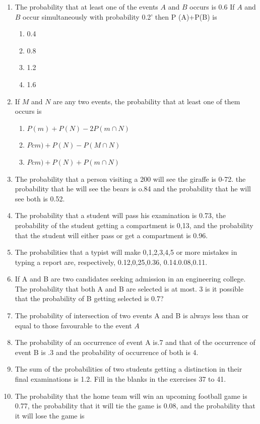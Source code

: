 \documentclass[12pt]{article}
\begin{document}
\begin{enumerate}
\item The probability that at least one of the events $A$ and $B$ occurs is 0.6 If $A$ and $B$ occur simultaneously with probability 0.2' then P  (A)+P(B) is
	\begin{enumerate}
\item 0.4
\item 0.8
\item 1.2
\item 1.6
	\end{enumerate}
\item If $M$ and $N$ are any two events, the probability that at least one of them occurs is
	\begin{enumerate}
\item $P(m)+P(N)-2 P (m\cap N)$
\item $Pcm)+P(N)-P(M\cap N)$
\item $Pcm)+P(N)+P(m\cap N)$
	\end{enumerate}
\item The probability that a person visiting a 200 will see the giraffe is 0-72. the probability that he will see the bears is o.84 and the probability that he will see both is 0.52.
\item The probability that a student will pass his examination is 0.73, the probability of the student getting a compartment is 0,13, and the probability that the student will either pass or get a compartment is 0.96.
\item The probabilities that a typist will make 0,1,2,3,4,5 or more mistakes in typing a report are, respectively, 0.12,0,25,0.36, 0.14.0.08,0.11.
\item If A and B are two candidates seeking admission in an engineering college. The probability that both A and B are selected is at most. 3 is it possible that the probability of B getting selected is 0.7?
\item The probability of intersection of two events A and B is always less than or equal to those favourable to the event $A$
\item The probability of an occurrence of event A is.7 and that of the occurrence of event B is .3 and the probability of occurrence of both is 4.
\item The sum of the probabilities of two students getting a distinction in their final examinations is 1.2. 
Fill in the blanks in the exercises 37 to 41. 
\item The probability that the home team will win an upcoming football game is 0.77, the probability that it will tie the game is 0.08, and the probability that it will lose the game is     

\end{enumerate}
\end{document}
